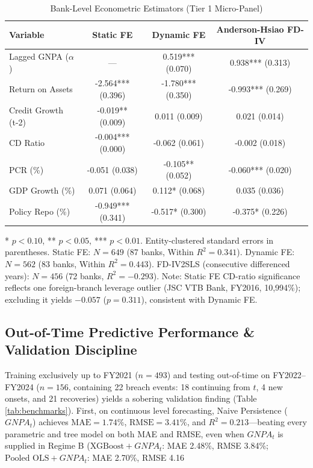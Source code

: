 \documentclass[conference]{IEEEtran}
\begin{document}
\begin{table}[htbp]
\caption{Bank-Level Econometric Estimators (Tier 1 Micro-Panel)}
\begin{center}
\begin{tabular}{lccc}
\toprule
\textbf{Variable} & \textbf{Static FE} & \textbf{Dynamic FE} & \textbf{Anderson-Hsiao FD-IV} \\
\midrule
Lagged GNPA ($\alpha$) & --- & 0.519*** (0.070) & 0.938*** (0.313) \\
Return on Assets & -2.564*** (0.396) & -1.780*** (0.350) & -0.993*** (0.269) \\
Credit Growth (t-2) & -0.019** (0.009) & 0.011 (0.009) & 0.021 (0.014) \\
CD Ratio & -0.004*** (0.000) & -0.062 (0.061) & -0.002 (0.018) \\
PCR (\%) & -0.051 (0.038) & -0.105** (0.052) & -0.060*** (0.020) \\
GDP Growth (\%) & 0.071 (0.064) & 0.112* (0.068) & 0.035 (0.036) \\
Policy Repo (\%) & -0.949*** (0.341) & -0.517* (0.300) & -0.375* (0.226) \\
\bottomrule
\end{tabular}
\end{center}
\vspace{-1mm}
\footnotesize{* $p < 0.10$, ** $p < 0.05$, *** $p < 0.01$. Entity-clustered standard errors in parentheses. Static FE: $N = 649$ (87 banks, Within $R^2 = 0.341$). Dynamic FE: $N = 562$ (83 banks, Within $R^2 = 0.443$). FD-IV2SLS (consecutive differenced years): $N = 456$ (72 banks, $R^2 = -0.293$). Note: Static FE CD-ratio significance reflects one foreign-branch leverage outlier (JSC VTB Bank, FY2016, 10,994\%); excluding it yields $-0.057$ ($p = 0.311$), consistent with Dynamic FE.}
\label{tab:econometric}
\end{table}

\subsection{Out-of-Time Predictive Performance \& Validation Discipline}
Training exclusively up to FY2021 ($n = 493$) and testing out-of-time on FY2022--FY2024 ($n = 156$, containing 22 breach events: 18 continuing from $t$, 4 new onsets, and 21 recoveries) yields a sobering validation finding (Table \ref{tab:benchmarks}). First, on continuous level forecasting, Naive Persistence ($GNPA_t$) achieves $\text{MAE} = 1.74\%$, $\text{RMSE} = 3.41\%$, and $R^2 = 0.213$---beating every parametric and tree model on both MAE and RMSE, even when $GNPA_t$ is supplied in Regime B ($\text{XGBoost}+GNPA_t$: MAE 2.48\%, RMSE 3.84\%; $\text{Pooled OLS}+GNPA_t$: MAE 2.70\%, RMSE 4.16%
\end{document}
